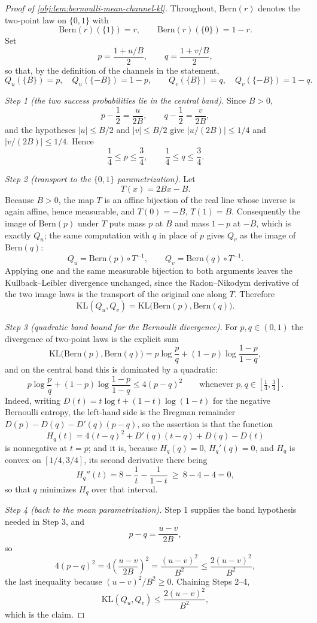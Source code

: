 \documentclass[11pt]{article}
\begin{document}
\begin{proof}[Proof of \cref{obj:lem:bernoulli-mean-channel-kl}]
Throughout, \(\mathrm{Bern}(r)\) denotes the two-point law on \(\{0,1\}\) with
\[
\mathrm{Bern}(r)(\{1\})=r,
\qquad
\mathrm{Bern}(r)(\{0\})=1-r .
\]
Set
\[
p=\frac{1+u/B}{2},
\qquad
q=\frac{1+v/B}{2},
\]
so that, by the definition of the channels in the statement,
\[
Q_u(\{B\})=p,\quad Q_u(\{-B\})=1-p,
\qquad
Q_v(\{B\})=q,\quad Q_v(\{-B\})=1-q .
\]

\emph{Step 1 (the two success probabilities lie in the central band).} Since \(B>0\),
\[
p-\frac12=\frac{u}{2B},
\qquad
q-\frac12=\frac{v}{2B},
\]
and the hypotheses \(|u|\le B/2\) and \(|v|\le B/2\) give \(|u/(2B)|\le 1/4\) and \(|v/(2B)|\le 1/4\). Hence
\[
\frac14\le p\le \frac34,
\qquad
\frac14\le q\le \frac34 .
\]

\emph{Step 2 (transport to the \(\{0,1\}\) parametrization).} Let
\[
T(x)=2Bx-B .
\]
Because \(B>0\), the map \(T\) is an affine bijection of the real line whose inverse is again
affine, hence measurable, and \(T(0)=-B\), \(T(1)=B\). Consequently the image of
\(\mathrm{Bern}(p)\) under \(T\) puts mass \(p\) at \(B\) and mass \(1-p\) at \(-B\), which is exactly
\(Q_u\); the same computation with \(q\) in place of \(p\) gives \(Q_v\) as the image of
\(\mathrm{Bern}(q)\):
\[
Q_u=\mathrm{Bern}(p)\circ T^{-1},
\qquad
Q_v=\mathrm{Bern}(q)\circ T^{-1}.
\]
Applying one and the same measurable bijection to both arguments leaves the
Kullback--Leibler divergence unchanged, since the Radon--Nikodym derivative of the two image
laws is the transport of the original one along \(T\). Therefore
\[
\mathrm{KL}(Q_u,Q_v)
=
\mathrm{KL}\bigl(\mathrm{Bern}(p),\mathrm{Bern}(q)\bigr).
\]

\emph{Step 3 (quadratic band bound for the Bernoulli divergence).} For \(p,q\in(0,1)\) the
divergence of two-point laws is the explicit sum
\[
\mathrm{KL}\bigl(\mathrm{Bern}(p),\mathrm{Bern}(q)\bigr)
=
p\log\frac pq+(1-p)\log\frac{1-p}{1-q},
\]
and on the central band this is dominated by a quadratic:
\[
p\log\frac pq+(1-p)\log\frac{1-p}{1-q}
\le
4(p-q)^2
\qquad\text{whenever }p,q\in\left[\tfrac14,\tfrac34\right].
\]
Indeed, writing \(D(t)=t\log t+(1-t)\log(1-t)\) for the negative Bernoulli entropy, the left-hand
side is the Bregman remainder \(D(p)-D(q)-D'(q)(p-q)\), so the assertion is that the function
\[
H_q(t)=4(t-q)^2+D'(q)(t-q)+D(q)-D(t)
\]
is nonnegative at \(t=p\); and it is, because \(H_q(q)=0\), \(H_q'(q)=0\), and \(H_q\) is convex on
\([1/4,3/4]\), its second derivative there being
\[
H_q''(t)=8-\frac1t-\frac1{1-t}\ \ge\ 8-4-4=0 ,
\]
so that \(q\) minimizes \(H_q\) over that interval.

\emph{Step 4 (back to the mean parametrization).} Step 1 supplies the band hypothesis needed in
Step 3, and
\[
p-q=\frac{u-v}{2B},
\]
so
\[
4(p-q)^2
=
4\left(\frac{u-v}{2B}\right)^2
=
\frac{(u-v)^2}{B^2}
\le
\frac{2(u-v)^2}{B^2},
\]
the last inequality because \((u-v)^2/B^2\ge 0\). Chaining Steps 2--4,
\[
\mathrm{KL}(Q_u,Q_v)
\le
\frac{2(u-v)^2}{B^2},
\]
which is the claim. %
\end{proof}
\end{document}
